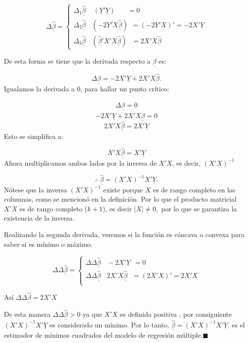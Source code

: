 \documentclass[
  a4paper,
  oneside,
  openany]{book}
\begin{document}
\[
\Delta\underline{\hat{\beta}}=\left\{
\begin{array}{ll}
\Delta_{1} \underline{\hat{\beta}} \ \ \ \ \ \left(\underline{Y}'\underline{Y}\right)  \ \ \ \ \ \ \ \ =0 \\
\Delta_{2} \underline{\hat{\beta}} \ \ \ \ \left( -2\underline{Y}'X\underline{\hat{\beta}}\right) \ \ = \left(-2\underline{Y}'X\right)'=-2X'\underline{Y} \\
\Delta_{3} \underline{\hat{\beta}} \ \  \ \ \left( \underline{\hat{\beta}'}X'X\underline{\hat{\beta}}\right)  \ \ \ = 2X'X\underline{\hat{\beta}}
\end{array}
\right. 
\]

De esta forma se tiene que la derivada respecto a \(\underline{\beta}\) es:

\[\Delta \underline{\beta}=-2X'\underline{Y}+2X'X\underline{\hat{\beta}}.\]
Igualamos la derivada a 0, para hallar un punto crítico:

\[\Delta \underline{\hat{\beta}}=0\]
\[-2X'\underline{Y}+2X'X\underline{\hat{\beta}}=0\]
\[2X'X\underline{\hat{\beta}}=2X'\underline{Y}\]
Esto se simplifica a:

\[X'X\underline{\hat{\beta}}=X'\underline{Y}\]
Ahora multiplicamos ambos lados por la inversa de \(X'X\), es decir, \((X'X)^{-1}\)

\[\therefore \  \underline{\hat{\beta}}=\left(X'X\right)^{-1}X'\underline{Y}.\]
Nótese que la inversa \(\left(X'X\right)^{-1}\) existe porque \(X\) es de rango completo en las columnas, como se mencionó en la definición. Por lo que el producto matricial \(X'X\) es de rango completo (\(k+1\)), es decir \(|X|\neq 0,\) por lo que se garantiza la existencia de la inversa.

Realizando la segunda derivada, veremos si la función es cóncava o convexa para saber si es mínimo o máximo.

\[
\Delta \Delta \underline{\hat{\beta}}=\left\{
\begin{array}{ll}
\Delta \Delta \underline{\hat{\beta}} \ \ \ \ -2X' \underline{Y} \ \ =0 \\
\Delta \Delta \underline{\hat{\beta}} \ \ \ \ 2X'X \underline{\hat{\beta}}  \ \ \ = \left(2X'X\right)' =2X'X \\
\end{array}
\right.
\]

Así \(\Delta \Delta \underline{\hat{\beta}}=2X'X\)

De esta manera \(\Delta \Delta \underline{\hat{\beta}}>0\) ya que \(X'X\) es definida positiva , por consiguiente \((X'X)^{-1}X'\underline{Y}\) es considerado un mínimo. Por lo tanto, \(\underline{\hat{\beta}}=\left(X'X\right)^{-1}X'\underline{Y}.\) es el estimador de mínimos cuadrados del modelo de regresión múltiple.\(\blacksquare\)
\end{document}

